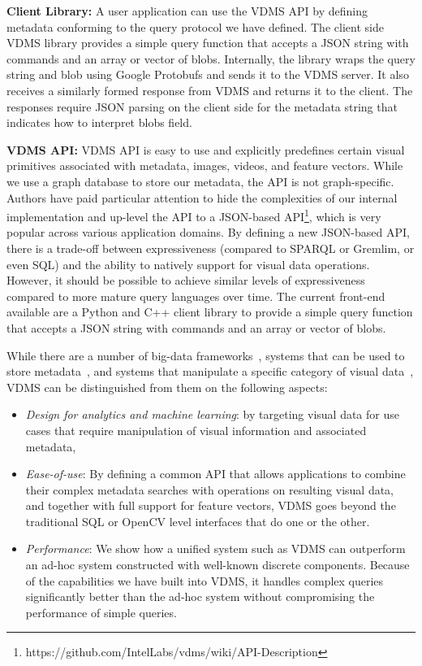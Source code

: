 \textbf{Client Library:}
A user application can use the VDMS API by defining metadata conforming to the
query protocol we have defined.
The client side VDMS library provides a simple query function that
accepts a JSON string with commands and an array or vector of blobs.
Internally, the library wraps the query string and blob using
Google Protobufs \cite{protobufs} and sends it to the VDMS server.
It also receives a similarly formed response from VDMS
and returns it to the client. The responses require JSON parsing on the client
side for the metadata string that indicates how to interpret blobs field.

\textbf{VDMS API:}
VDMS API is easy to use and explicitly predefines certain
visual primitives associated with metadata, images, videos, and feature vectors.
While we use a graph database to store our metadata,
the API is not graph-specific.
Authors have paid particular attention to hide the complexities of our internal
implementation and up-level the API to a JSON-based
API\footnote{https://github.com/IntelLabs/vdms/wiki/API-Description},
which is very popular across various application domains.
By defining a new JSON-based API, there is a trade-off between
expressiveness (compared to SPARQL or Gremlim, or even SQL) and
the ability to natively support for visual data operations.
However, it should be possible to achieve similar levels of
expressiveness compared to more mature query languages over time.
The current front-end available are a Python and C++ client
library to provide a simple query function that accepts a JSON string with
commands and an array or vector of blobs.

While there are a number of big-data frameworks~\cite{spark, hadoop}, systems
that can be used to store metadata~\cite{memsql, vertica}, and systems that
manipulate a specific category of visual data~\cite{scidb, rasdaman}, VDMS can
be distinguished from them on the following aspects:

\begin{itemize}
\item {\em Design for analytics and machine learning}: by targeting
visual data for use cases that require manipulation
of visual information and associated metadata,
\item {\em Ease-of-use}: By defining a common API that allows applications to
combine their complex metadata searches with operations on resulting visual
data, and together with full support for feature vectors, VDMS goes beyond the
traditional SQL or OpenCV level interfaces that do one or the other.
\item {\em Performance}: We show how a unified system such as VDMS can
outperform an ad-hoc system constructed with well-known discrete components.
Because of the capabilities we have built into VDMS, it handles complex
queries significantly better than the ad-hoc system without compromising the
performance of simple queries.
\end{itemize}
